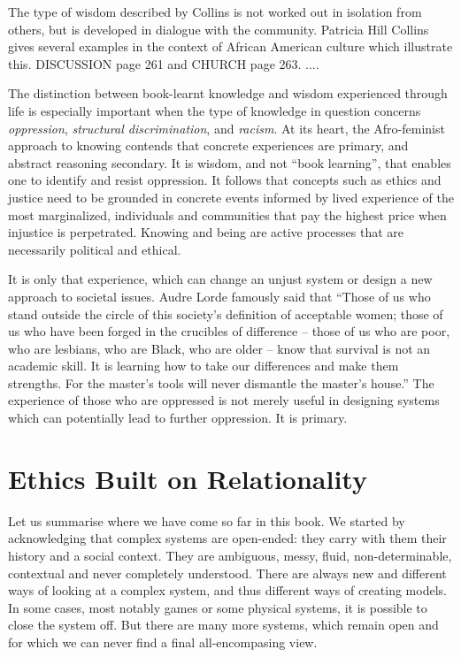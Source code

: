 The type of wisdom described by Collins is not worked out in isolation from others, but is developed in dialogue with the community. Patricia Hill Collins \cite{collins2002black} gives several examples in the context of African American culture which illustrate this. DISCUSSION page 261 and CHURCH page 263. ....



The distinction between book-learnt knowledge and wisdom experienced through life is especially important when the type of knowledge in question concerns \textit{oppression}, \textit{structural discrimination}, and \textit{racism}. At its heart, the Afro-feminist approach to knowing contends that concrete experiences are primary, and abstract reasoning secondary. It is wisdom, and not ``book learning'', that enables one to identify and resist oppression. It follows that concepts such as ethics and justice need to be grounded in concrete events informed by lived experience of the most marginalized, individuals and communities that pay the highest price when injustice is perpetrated. Knowing and being are active processes that are necessarily political and ethical. 

It is only that experience, which can change an unjust system or design a new approach to societal issues. Audre Lorde famously said that ``Those of us who stand outside the circle of this society's definition of acceptable women; those of us who have been forged in the crucibles of difference -- those of us who are poor, who are lesbians, who are Black, who are older -- know that survival is not an academic skill. It is learning how to take our differences and make them strengths. For the master's tools will never dismantle the master's house.'' \cite{lorde2003master} The experience of those who are oppressed is not merely useful in designing systems which can potentially lead to further oppression. It is primary.

\section{Ethics Built on Relationality}

\label{sec:ethics built on}

Let us summarise where we have come so far in this book. We started by acknowledging that complex systems are open-ended: they carry with them their history and a social context. They are ambiguous, messy, fluid, non-determinable, contextual and never completely understood. There are always new and different ways of looking at a complex system, and thus different ways of creating models. In some cases, most notably games or some physical systems, it is possible to close the system off. But there are many more systems, which remain open and for which we can never find a final all-encompasing view.

